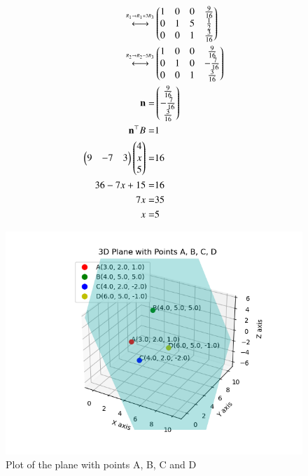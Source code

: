\documentclass[journal]{IEEEtran}
\begin{document}
\begin{align}
    \system{}{R_1 \to R_1+3R_3}&\myvec{1 & 0 & 0 & \frac{9}{16} \\ 0 & 1 & 5 & \frac{1}{2} \\ 0 & 0 & 1 & \frac{3}{16}} \\
    \system{}{R_2 \to R_2-5R_3}&\myvec{1 & 0 & 0 & \frac{9}{16} \\ 0 & 1 & 0 & -\frac{7}{16} \\ 0 & 0 & 1 & \frac{3}{16}} \\
    \vec{n}=&\myvec{\frac{9}{16} \\ -\frac{7}{16} \\ \frac{3}{16}} \\
    \vec{n}^{\top}B=&1 \\
    \myvec{9 & -7 & 3}\myvec{4 \\ x \\ 5}=&16 \\
    36-7x+15=&16 \\
    7x=&35 \\
    x=&5
\end{align}
\begin{figure}[ht!]
	\centering
   	\includegraphics[width=\linewidth]{figs/fig.png}
   	\caption{Plot of the plane with points A, B, C and D}
\label{Plot}
\end{figure}
\end{document}
